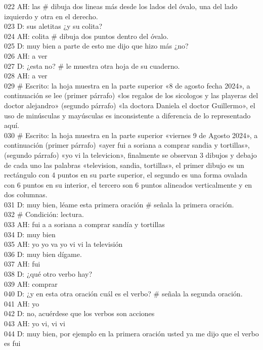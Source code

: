 022 AH: las \# dibuja dos lineas más desde los lados del óvalo, una del lado izquierdo y otra en el derecho.\\
023 D: sus aletitas ¿y su colita?\\
024 AH: colita \# dibuja dos puntos dentro del óvalo.\\
025 D: muy bien a parte de esto me dijo que hizo más ¿no?\\
026 AH: a ver\\
027 D: ¿esta no? \# le muestra otra hoja de su cuaderno.\\
028 AH: a ver\\
029 \# Escrito: la hoja muestra en la parte superior «8 de agosto fecha 2024», a continuación se lee (primer párrafo) «los regalos de los sicologos y las playeras del doctor alejandro» (segundo párrafo) «la doctora Daniela el doctor Guillermo», el uso de minúsculas y mayúsculas es inconsistente a diferencia de lo representado aquí.\\
030 \# Escrito: la hoja muestra en la parte superior «viernes 9  de Agosto 2024», a continuación (primer párrafo) «ayer fui a soriana a comprar sandia y tortillas», (segundo párrafo) «yo vi la televicion», finalmente se observan 3 dibujos y debajo de cada uno las palabras «television, sandia, tortillas», el primer dibujo es un rectángulo con 4 puntos en su parte superior, el segundo es una forma ovalada con 6 puntos en su interior, el tercero son 6 puntos alineados verticalmente y en dos columnas.\\
031 D: muy bien, léame esta primera oración \# señala la primera oración.\\
032 \# Condición: lectura.\\
033 AH: fui a a soriana a comprar sandía y tortillas\\
034 D: muy bien\\
035 AH: yo yo va yo vi vi la televisión\\
036 D: muy bien dígame.\\
037 AH: fui\\
038 D: ¿qué otro verbo hay?\\
039 AH: comprar\\
040 D: ¿y en esta otra oración cuál es el verbo? \# señala la segunda oración.\\
041 AH: yo\\
042 D: no, acuérdese que los verbos son acciones\\
043 AH: yo vi, vi vi\\
044 D: muy bien, por ejemplo en la primera oración usted ya me dijo que el verbo es fui\\
